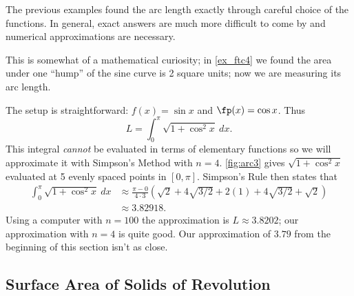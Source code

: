The previous examples found the arc length exactly through careful choice of the functions. In general, exact answers are much more difficult to come by and numerical approximations are necessary.

{This is somewhat of a mathematical curiosity; in \autoref{ex_ftc4} we found the area under one ``hump'' of the sine curve is 2 square units; now we are measuring its arc length.

The setup is straightforward: $f(x) = \sin x$ and $\fp(x) = \cos x$. Thus 
\[L = \int_0^\pi \sqrt{1+\cos^2x}\ dx.\]
This integral \textit{cannot} be evaluated in terms of elementary functions so we will approximate it with Simpson's Method with $n=4$. \autoref{fig:arc3} gives $\sqrt{1+\cos^2x}$ evaluated at 5 evenly spaced points in $[0,\pi]$. Simpson's Rule then states that 
\begin{align*}
	\int_0^\pi \sqrt{1+\cos^2x}\ dx
	&\approx	\frac{\pi-0}{4\cdot 3}
	\left(\sqrt{2}+4\sqrt{3/2}+2(1)+4\sqrt{3/2}+\sqrt{2}\right) \\
	&\approx3.82918.
\end{align*}
Using a computer with $n=100$ the approximation is $L\approx 3.8202$; our approximation with $n=4$ is quite good.  Our approximation of $3.79$ from the beginning of this section isn't as close.}

\subsection{Surface Area of Solids of Revolution}


